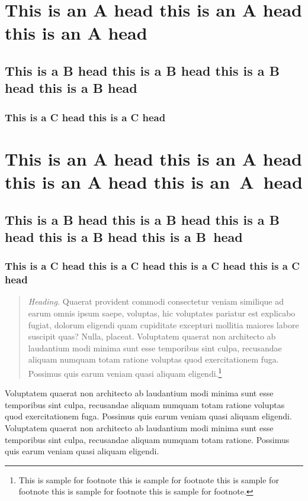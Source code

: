 \documentclass[autowc]{CUP-JNL-PPS}
\begin{document}
\section[This is an A Head]{This is an A head this is an A head this is an A head}
\lipsum[1]

\subsection{This is a B head this is a B head this is a B head this is a B head}

\lipsum[2]

\subsubsection{This is a C head this is a C head}

\lipsum[3]

\section[This is an A Head]{This is an A head this is an A head this is an A head this is an~A~head}
\subsection{This is a B head this is a B head this is a B head this is a B head this is a B~head}
\subsubsection{This is a C head this is a C head this is a C head this is a C head}
\lipsum[4]
\begin{quote}
\textit{Heading.} Quaerat provident commodi consectetur veniam similique ad
earum omnis ipsum saepe, voluptas, hic voluptates pariatur est explicabo
fugiat, dolorum eligendi quam cupiditate excepturi mollitia maiores labore
suscipit quas? Nulla, placeat. Voluptatem quaerat non architecto ab laudantium
modi minima sunt esse temporibus sint culpa, recusandae aliquam numquam
totam ratione voluptas quod exercitationem fuga. Possimus quis earum veniam
quasi aliquam eligendi.\footnote{This is sample for footnote this is sample for footnote this is sample for footnote  this is sample for footnote this is sample for footnote.}%
\end{quote}%

Voluptatem quaerat non architecto ab laudantium
modi minima sunt esse temporibus sint culpa, recusandae aliquam numquam
totam ratione voluptas quod exercitationem fuga. Possimus quis earum veniam
quasi aliquam eligendi.
Voluptatem quaerat non architecto ab laudantium
modi minima sunt esse temporibus sint culpa, recusandae aliquam numquam
totam ratione. Possimus quis earum veniam
quasi aliquam eligendi.
\end{document}

